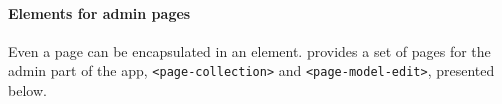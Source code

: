 \paragraph{Elements for admin pages}

Even a page can be encapsulated in an element.  provides a set of pages for the admin part of the app, \texttt{<page-collection>} and \texttt{<page-model-edit>}, presented below.


